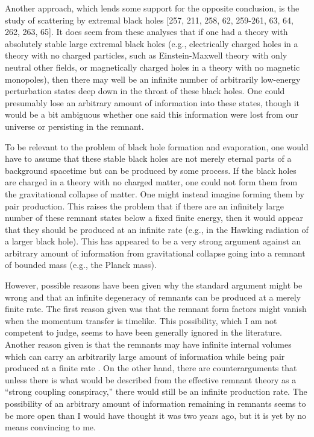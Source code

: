      Another approach, which lends some support for the opposite
conclusion, is
the study of scattering by extremal black holes
[257, 211, 258, 62, 259-261, 63, 64, 262, 263, 65].
It does seem from these analyses that if one had a theory
with absolutely stable large extremal black holes
(e.g., electrically charged holes in a theory with no charged
particles,
such as Einstein-Maxwell theory with only neutral other fields, or
magnetically
charged holes in a theory with no magnetic monopoles), then there may
well be
an infinite number of arbitrarily low-energy perturbation states deep
down in
the throat of these black holes.  One could presumably lose an
arbitrary amount
of information into these states, though it would be a bit ambiguous
whether
one said this information were lost from our universe or persisting
in the
remnant.

     To be relevant to the problem of black hole formation and
evaporation, one
would have to assume that these stable black holes are not merely
eternal parts
of a background spacetime but can be produced by some process.  If
the black
holes are charged in a theory with no charged matter, one could not
form them
from the gravitational collapse of matter.  One might instead imagine
forming
them by pair production.  This raises the problem that if there are
an
infinitely large number of these remnant states below a fixed finite
energy,
then it would appear that they should be produced at an infinite rate
\cite{ACN} (e.g., in the Hawking radiation of a larger black hole).
This has
appeared to be a very strong argument against an arbitrary amount of
information from gravitational collapse going into a remnant of
bounded mass
(e.g., the Planck mass).

     However, possible reasons have been given why the standard
argument might
be wrong and that an infinite degeneracy of remnants can be produced
at a
merely finite rate.  The first reason given \cite{ACN} was that the
remnant
form factors might vanish when the momentum transfer is timelike.
This
possibility, which I am not competent to judge, seems to have been
generally
ignored in the literature.  Another reason given is that the remnants
may have
infinite internal volumes which can carry an arbitrarily large amount
of
information while being pair produced at a finite rate
\cite{BO'L,BO'LS,ST,LO'L}.
On the other hand, there are counterarguments \cite{Gid93} that
unless there
is
what would be described from the effective remnant
theory as a ``strong coupling conspiracy,'' there would still be an
infinite
production rate.  The possibility of an arbitrary amount of
information
remaining in remnants seems to be more open than I would have thought
it was
two years ago, but it is yet by no means convincing to me.

